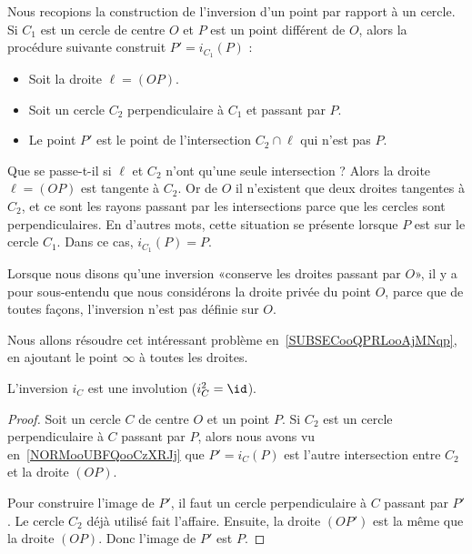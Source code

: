 \begin{normaltext}      \label{NORMooUBFQooCzXRJj}
	Nous recopions la construction de l'inversion d'un point par rapport à un cercle. Si \( C_1\) est un cercle de centre \( O\) et \( P\) est un point différent de \( O\), alors la procédure suivante construit \( P'=i_{C_1}(P)\) :
	\begin{itemize}
		\item Soit la droite \( \ell=(OP)\).
		\item Soit un cercle \( C_2\) perpendiculaire à \( C_1\) et passant par \( P\).
		\item Le point \( P'\) est le point de l'intersection \( C_2\cap\ell\) qui n'est pas \( P\).
	\end{itemize}
	Que se passe-t-il si \( \ell\) et \( C_2\) n'ont qu'une seule intersection ? Alors la droite \( \ell=(OP)\) est tangente à \( C_2\). Or de \( O \) il n'existent que deux droites tangentes à \( C_2\), et ce sont les rayons passant par les intersections parce que les cercles sont perpendiculaires. En d'autres mots, cette situation se présente lorsque \( P\) est sur le cercle \( C_1\). Dans ce cas, \( i_{C_1}(P)=P\).
\end{normaltext}

\begin{remark}
	Lorsque nous disons qu'une inversion «conserve les droites passant par \( O\)», il y a pour sous-entendu que nous considérons la droite privée du point \( O\), parce que de toutes façons, l'inversion n'est pas définie sur \( O\).

	Nous allons résoudre cet intéressant problème en~\ref{SUBSECooQPRLooAjMNqp}, en ajoutant le point \( \infty\) à toutes les droites.
\end{remark}

\begin{corollary}
	L'inversion \( i_C\) est une involution (\( i_C^2=\id\)).
\end{corollary}

\begin{proof}
	Soit un cercle \( C\) de centre \( O\) et un point \( P\). Si \( C_2\) est un cercle perpendiculaire à \( C\) passant par \( P\), alors nous avons vu en~\ref{NORMooUBFQooCzXRJj} que \( P'=i_C(P)\) est l'autre intersection entre \( C_2\) et la droite \( (OP)\).

	Pour construire l'image de \( P'\), il faut un cercle perpendiculaire à \( C\) passant par \( P'\). Le cercle \( C_2\) déjà utilisé fait l'affaire. Ensuite, la droite \( (OP')\) est la même que la droite \( (OP)\). Donc l'image de \( P'\) est \( P\).
\end{proof}


